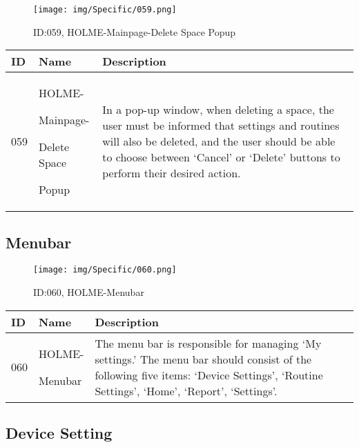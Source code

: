 \documentclass[conference]{IEEEtran}
\begin{document}
\begin{enumerate}
\begin{figure}[h]
\centering
\texttt{[image: img/Specific/059.png]}
\caption{ID:059, HOLME-Mainpage-Delete Space Popup}
\end{figure}
\begin{table}[h]
\def\arraystretch{1.2} \small
    \begin{tabular}{|p{1cm}|p{1.8cm}|p{5.0cm}|}
        \hline
        ID & Name & Description\\ \hline
         059 \par  & HOLME-\par Mainpage-\par Delete Space\par Popup  &In a pop-up window, when deleting a space, the user must be informed that settings and routines will also be deleted, and the user should be able to choose between `Cancel' or `Delete' buttons to perform their desired action.\\ \hline
    \end{tabular}
\end{table}

\vspace{6cm}

\subsection{Menubar}
\begin{figure}[h]
\centering
\texttt{[image: img/Specific/060.png]}
\caption{ID:060, HOLME-Menubar}
\end{figure}
\begin{table}[h]
\def\arraystretch{1.2} \small
    \begin{tabular}{|p{1cm}|p{1.8cm}|p{5.0cm}|}
        \hline
        ID & Name & Description\\ \hline
         060 \par  & HOLME-\par Menubar  &The menu bar is responsible for managing `My settings.' The menu bar should consist of the following five items: `Device Settings', `Routine Settings', `Home', `Report', `Settings'.\\ \hline
    \end{tabular}
\end{table}

\subsection{Device Setting}


\end{enumerate}
\end{document}
